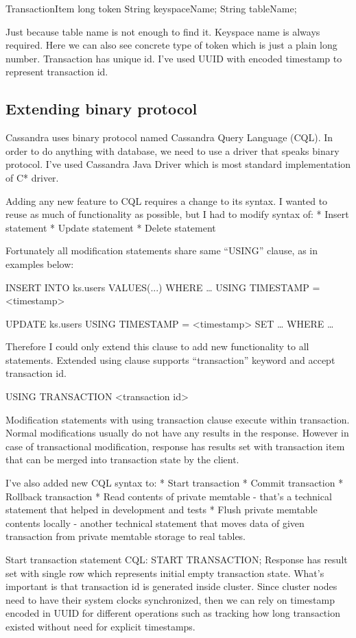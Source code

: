 TransactionItem {
   long token
   String keyspaceName;
   String tableName;
}


Just because table name is not enough to find it. Keyspace name is always required. Here we can also see concrete type of token which is just a plain long number.
Transaction has unique id. I’ve used UUID with encoded timestamp to represent transaction id.


\subsection{Extending binary protocol}
Cassandra uses binary protocol named Cassandra Query Language (CQL). In order to do anything with database, we need to use a driver that speaks binary protocol. I’ve used Cassandra Java Driver which is most standard implementation of C* driver.


Adding any new feature to CQL requires a change to its syntax. I wanted to reuse as much of functionality as possible, but I had to modify syntax of:
* Insert statement
* Update statement
* Delete statement


Fortunately all modification statements share same “USING” clause, as in examples below:


INSERT INTO ks.users VALUES(...) WHERE … USING TIMESTAMP = <timestamp>


UPDATE ks.users USING TIMESTAMP = <timestamp> SET … WHERE … 


Therefore I could only extend this clause to add new functionality to all statements. Extended using clause supports “transaction” keyword and accept transaction id.


USING TRANSACTION <transaction id>


Modification statements with using transaction clause execute within transaction. 
Normal modifications usually do not have any results in the response. However in case of transactional modification, response has results set with transaction item that can be merged into transaction state by the client.


I’ve also added new CQL syntax to:
* Start transaction
* Commit transaction
* Rollback transaction
* Read contents of private memtable - that’s a technical statement that helped in development and tests
* Flush private memtable contents locally - another technical statement that moves data of given transaction from private memtable storage to real tables.


Start transaction statement
CQL:        START TRANSACTION;
Response has result set with single row which represents initial empty transaction state. 
What’s important is that transaction id is generated inside cluster. Since cluster nodes need to have their system clocks synchronized, then we can rely on timestamp encoded in UUID for different operations such as tracking how long transaction existed without need for explicit timestamps.


